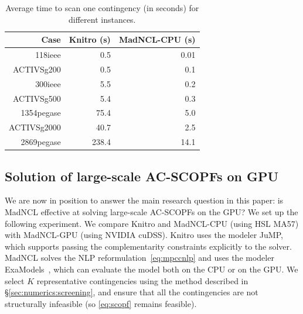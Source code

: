 \documentclass{IEEEtran4PSCC}
\begin{document}
\begin{table}[!ht]
\centering
\caption{Average time to scan one contingency (in seconds) for different instances.}
\begin{tabular}{|r|rr|}
  \hline
  Case  & Knitro (s) & MadNCL-CPU (s) \\
  \hline
  118ieee & 0.5 & 0.01 \\
  ACTIVSg200 & 0.5 & 0.1 \\
  300ieee & 5.5 & 0.2 \\
  ACTIVSg500 & 5.4 &  0.3  \\
  1354pegase & 75.4  & 5.0 \\
  ACTIVSg2000 & 40.7 & 2.5  \\
  2869pegase & 238.4  & 14.1  \\
  \hline
\end{tabular}
\label{tab:timecontingency}
\end{table}


\subsection{Solution of large-scale AC-SCOPFs on GPU}
\label{sec:numerics:scopf}
We are now in position to answer the main research question in this paper: is
MadNCL effective at solving large-scale AC-SCOPFs on the GPU?
We set up the following experiment.
We compare Knitro and MadNCL-CPU (using HSL MA57) with MadNCL-GPU (using NVIDIA cuDSS).
Knitro uses the modeler JuMP, which supports passing the complementarity constraints explicitly to the solver.
MadNCL solves the NLP reformulation~\eqref{eq:mpccnlp} and uses
the modeler ExaModels~\cite{shin2024accelerating}, which can evaluate the model both on the CPU or on the GPU.
We select $K$ representative contingencies using the method described in \S\ref{sec:numerics:screening},
and ensure that all the contingencies are not structurally infeasible (so \eqref{eq:scopf} remains feasible).
\end{document}
